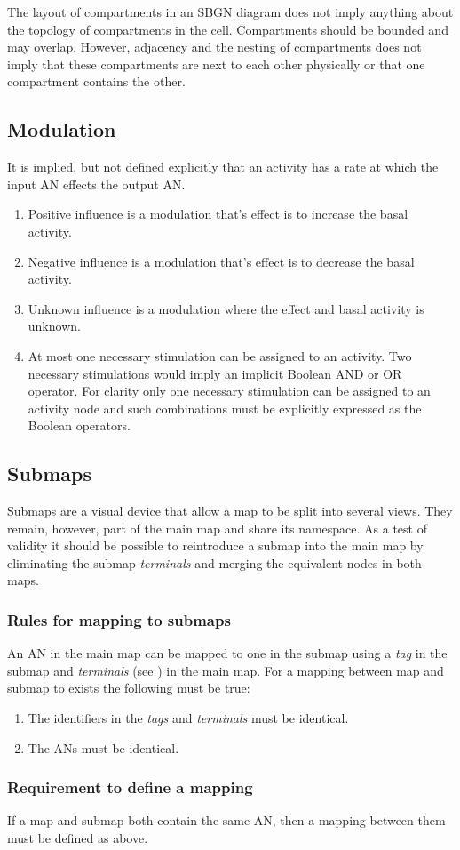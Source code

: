 The layout of compartments in an SBGN diagram does not imply anything about the topology of compartments in the cell. Compartments should be bounded and may overlap. However, adjacency and the nesting of compartments does not imply that these compartments are next to each other physically or that one compartment contains the other.

\subsection{Modulation}

It is implied, but not defined explicitly that an activity has a rate at which the input AN effects the output AN. 

\begin{enumerate}
\item Positive influence is a modulation that's effect is to increase the basal activity.
\item Negative influence is a modulation that's effect is to decrease the basal activity.
\item Unknown influence is a modulation where the effect and basal activity is unknown.
\item At most one necessary stimulation can be assigned to an activity. Two necessary stimulations
  would imply an implicit Boolean AND or OR operator. For clarity only
  one necessary stimulation can be assigned to an activity node and such combinations must be
  explicitly expressed as the Boolean operators.
\end{enumerate}

\subsection{Submaps}

Submaps are a visual device that allow a map to be split into several views. They remain, however, part of the main map and share its namespace. As a test of validity it should be possible to reintroduce a submap into the main map by eliminating the submap \emph{terminals} and merging
the equivalent nodes in both maps.

\subsubsection{Rules for mapping to submaps}

An AN in the main map can be mapped to one in the submap using a \emph{tag} in the submap and \emph{terminals} (see ) in the main map. For a mapping between map and submap to exists the following must be true:

\begin{enumerate}
\item The identifiers in the \emph{tags} and \emph{terminals} must be identical.
\item The ANs must be identical.
\end{enumerate}

\subsubsection{Requirement to define a mapping}

If a map and submap both contain the same AN, then a mapping between them must be defined as above.